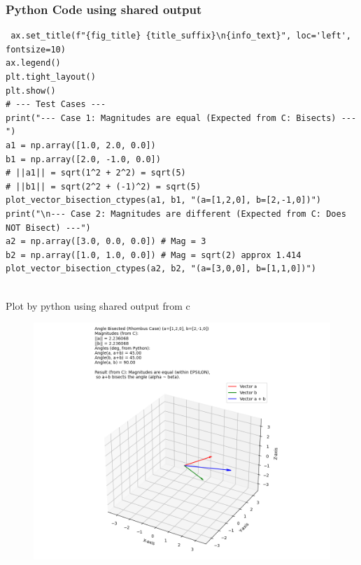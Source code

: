 \documentclass{beamer}
\begin{document}
		\begin{frame}[fragile]
			\frametitle{Python Code using shared output}
			\begin{lstlisting}
 ax.set_title(f"{fig_title} {title_suffix}\n{info_text}", loc='left', fontsize=10)
ax.legend()
plt.tight_layout()
plt.show()
# --- Test Cases ---
print("--- Case 1: Magnitudes are equal (Expected from C: Bisects) ---")
a1 = np.array([1.0, 2.0, 0.0])
b1 = np.array([2.0, -1.0, 0.0])
# ||a1|| = sqrt(1^2 + 2^2) = sqrt(5)
# ||b1|| = sqrt(2^2 + (-1)^2) = sqrt(5)
plot_vector_bisection_ctypes(a1, b1, "(a=[1,2,0], b=[2,-1,0])")
print("\n--- Case 2: Magnitudes are different (Expected from C: Does NOT Bisect) ---")
a2 = np.array([3.0, 0.0, 0.0]) # Mag = 3
b2 = np.array([1.0, 1.0, 0.0]) # Mag = sqrt(2) approx 1.414
plot_vector_bisection_ctypes(a2, b2, "(a=[3,0,0], b=[1,1,0])")
				
			\end{lstlisting}
		\end{frame}
		
		
		
		\begin{frame}{Plot by python using shared output from c}
			\begin{center}
				\begin{figure}[H]
					\centering
					\includegraphics[width = 0.8\columnwidth]{figs/Figure_1.png}
					\caption*{}
					\label{}
				\end{figure}
			\end{center}
		\end{frame}
		
		
	
\end{document}
